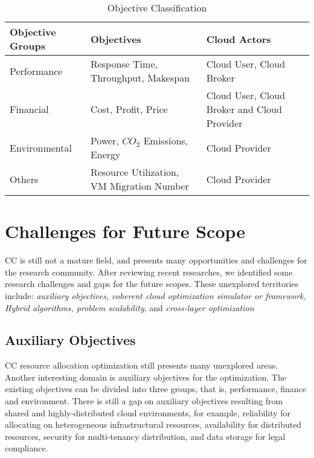 \documentclass[onecolumn,10pt]{asme2ej}
\begin{document}
\begin{table}[H]
\begin{center}
\begin{tabular}[b]{|l|l|l}
\rowcolor[gray]{.4}
\color{white}Objective Groups    				  & \color{white}Objectives & \color{white}Cloud Actors \\ \hline 
Performance 									  & Response Time, Throughput, Makespan  & Cloud User, Cloud Broker	\\ \hline
Financial 					                      & Cost, Profit, Price     & Cloud User, Cloud Broker and Cloud Provider \\ \hline
Environmental 				                      & Power, $CO_2$ Emissions, Energy	& Cloud Provider      		 \\ \hline
Others											  & Resource Utilization, VM Migration Number& Cloud Provider\\

\end{tabular}
\end{center}
\caption{Objective Classification}
\label{Obj}
\end{table}


\section{Challenges for Future Scope}
CC is still not a mature field, and presents many opportunities and challenges for the research community. After reviewing recent researches, we identified some research challenges and gaps for the future scopes. These unexplored territories include: \emph{auxiliary objectives, coherent cloud optimization simulator or framework, Hybrid algorithms, problem scalability}, and \emph{cross-layer optimization}

\subsection{Auxiliary Objectives}
CC resource allocation optimization still presents many unexplored areas. Another interesting domain is auxiliary objectives for the optimization. The existing objectives can be divided into three groups, that is, performance, finance and environment. There is still a gap on auxiliary objectives resulting from shared and highly-distributed cloud environments, for example, reliability for allocating on heterogeneous infrastructural resources, availability for distributed resources, security for multi-tenancy distribution, and data storage for legal compliance.  
\end{document}
